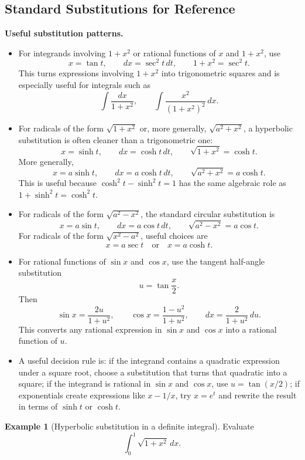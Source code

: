 \documentclass[11pt]{article}
\theoremstyle{definition}
\newtheorem{example}{Example}[section]
\begin{document}
\subsection{Standard Substitutions for Reference}
\textbf{Useful substitution patterns.}
\begin{itemize}
    \item For integrands involving $1+x^2$ or rational functions of $x$ and $1+x^2$, use
    \[
        x=\tan t, \qquad dx=\sec^2 t\,dt, \qquad 1+x^2=\sec^2 t.
    \]
    This turns expressions involving $1+x^2$ into trigonometric squares and is especially useful for integrals such as
    \[
        \int \frac{dx}{1+x^2}, \qquad \int \frac{x^2}{(1+x^2)^2}\,dx.
    \]
    \item For radicals of the form $\sqrt{1+x^2}$ or, more generally, $\sqrt{a^2+x^2}$, a hyperbolic substitution is often cleaner than a trigonometric one:
    \[
        x=\sinh t, \qquad dx=\cosh t\,dt, \qquad \sqrt{1+x^2}=\cosh t.
    \]
    More generally,
    \[
        x=a\sinh t, \qquad dx=a\cosh t\,dt, \qquad \sqrt{a^2+x^2}=a\cosh t.
    \]
    This is useful because $\cosh^2 t-\sinh^2 t=1$ has the same algebraic role as $1+\sinh^2 t=\cosh^2 t$.
    \item For radicals of the form $\sqrt{a^2-x^2}$, the standard circular substitution is
    \[
        x=a\sin t, \qquad dx=a\cos t\,dt, \qquad \sqrt{a^2-x^2}=a\cos t.
    \]
    For radicals of the form $\sqrt{x^2-a^2}$, useful choices are
    \[
        x=a\sec t \quad \text{or} \quad x=a\cosh t.
    \]
    \item For rational functions of $\sin x$ and $\cos x$, use the tangent half-angle substitution
    \[
        u=\tan\frac{x}{2}.
    \]
    Then
    \[
        \sin x = \frac{2u}{1+u^2},
        \qquad
        \cos x = \frac{1-u^2}{1+u^2},
        \qquad
        dx = \frac{2}{1+u^2}\,du.
    \]
    This converts any rational expression in $\sin x$ and $\cos x$ into a rational function of $u$.
    \item A useful decision rule is: if the integrand contains a quadratic expression under a square root, choose a substitution that turns that quadratic into a square; if the integrand is rational in $\sin x$ and $\cos x$, use $u=\tan(x/2)$; if exponentials create expressions like $x-1/x$, try $x=e^t$ and rewrite the result in terms of $\sinh t$ or $\cosh t$.
\end{itemize}

\begin{example}[Hyperbolic substitution in a definite integral]
Evaluate
\[
\int_0^1 \sqrt{1+x^2}\,dx.
\]
\end{example}
\end{document}
